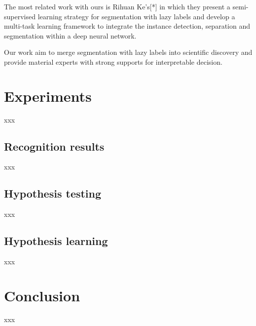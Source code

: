 \documentclass[10pt,twocolumn,letterpaper]{article}
\begin{document}
The most related work with ours is Rihuan Ke's[*] in which they present a semi-supervised learning strategy for segmentation with lazy labels and develop a multi-task learning framework to integrate the instance detection, separation and segmentation within a deep neural network.

Our work aim to merge segmentation with lazy labels into scientific discovery and provide material experts with strong supports for interpretable decision.

\section{Experiments}
xxx

\subsection{Recognition results}
xxx

\subsection{Hypothesis testing}
xxx

\subsection{Hypothesis learning}
xxx

\section{Conclusion}
xxx

{\small


}
\end{document}
